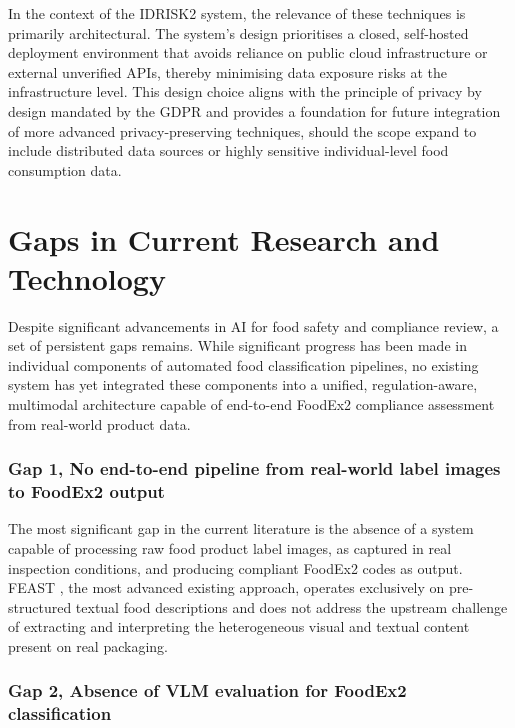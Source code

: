 In the context of the IDRISK2 system, the relevance of these techniques is primarily architectural. The system's design prioritises a closed, self-hosted deployment environment that avoids reliance on public cloud infrastructure or external unverified APIs, thereby minimising data exposure risks at the infrastructure level. This design choice aligns with the principle of privacy by design mandated by the GDPR and provides a foundation for future integration of more advanced privacy-preserving techniques, should the scope expand to include distributed data sources or highly sensitive individual-level food consumption data.

\hypertarget{gaps-in-current-research-and-technology}{%
\section{Gaps in Current Research and Technology}\label{gaps-in-current-research-and-technology}}

Despite significant advancements in AI for food safety and compliance review, a set of persistent gaps remains. While significant progress has been made in individual components of automated food classification pipelines, no existing system has yet integrated these components into a unified, regulation-aware, multimodal architecture capable of end-to-end FoodEx2 compliance assessment from real-world product data.

\hypertarget{gap-1-no-end-to-end-pipeline-from-real-world-label-images-to-foodex2-output}{%
\subsubsection{Gap 1, No end-to-end pipeline from real-world label images to FoodEx2 output}\label{gap-1-no-end-to-end-pipeline-from-real-world-label-images-to-foodex2-output}}

The most significant gap in the current literature is the absence of a system capable of processing raw food product label images, as captured in real inspection conditions, and producing compliant FoodEx2 codes as output. FEAST \parencite{lorenzo_molfetta_47d7c4cd}, the most advanced existing approach, operates exclusively on pre-structured textual food descriptions and does not address the upstream challenge of extracting and interpreting the heterogeneous visual and textual content present on real packaging.

\hypertarget{gap-2-absence-of-vlm-evaluation-for-foodex2-classification}{%
\subsubsection{Gap 2, Absence of VLM evaluation for FoodEx2 classification}\label{gap-2-absence-of-vlm-evaluation-for-foodex2-classification}}

